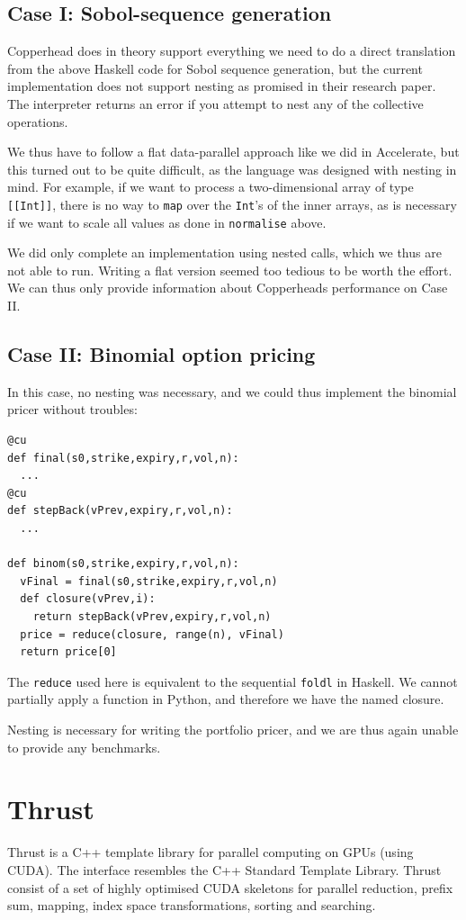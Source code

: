 \documentclass[preprint]{sigplanconf}
\begin{document}
\subsection{Case I: Sobol-sequence generation}
Copperhead does in theory support everything we need to do a direct
translation from the above Haskell code for Sobol sequence generation,
but the current implementation does not support nesting as promised in
their research paper. The interpreter returns an error if you attempt
to nest any of the collective operations.

We thus have to follow a flat data-parallel approach like we did in
Accelerate, but this turned out to be quite difficult, as the language
was designed with nesting in mind. For example, if we want to process
a two-dimensional array of type \verb|[[Int]]|, there is no way to
\verb|map| over the \verb|Int|'s of the inner arrays, as is
necessary if we want to scale all values as done in \verb|normalise|
above.

We did only complete an implementation using nested calls, which we
thus are not able to run. Writing a flat version seemed too tedious to
be worth the effort. We can thus only provide information about
Copperheads performance on Case II.

\subsection{Case II: Binomial option pricing}
In this case, no nesting was necessary, and we could thus implement
the binomial pricer without troubles:
\begin{verbatim}
@cu
def final(s0,strike,expiry,r,vol,n):
  ...
@cu
def stepBack(vPrev,expiry,r,vol,n):
  ...

def binom(s0,strike,expiry,r,vol,n):
  vFinal = final(s0,strike,expiry,r,vol,n)
  def closure(vPrev,i):
    return stepBack(vPrev,expiry,r,vol,n)
  price = reduce(closure, range(n), vFinal)
  return price[0]
\end{verbatim}

The \verb|reduce| used here is equivalent to the sequential
\verb|foldl| in Haskell. We cannot partially apply a function in
Python, and therefore we have the named closure.

Nesting is necessary for writing the portfolio pricer, and we are thus
again unable to provide any benchmarks.

\section{Thrust}
Thrust is a C++ template library for parallel computing on GPUs (using
CUDA). The interface resembles the C++ Standard Template
Library. Thrust consist of a set of highly optimised CUDA skeletons
for parallel reduction, prefix sum, mapping, index space
transformations, sorting and searching.
\end{document}
